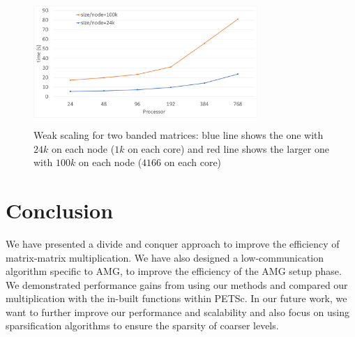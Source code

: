\begin{figure}[tbh]
 \centering
 \includegraphics[width=8.5cm,height=4.8cm]{./figures/weak1.pdf}
 \caption{Weak scaling for two banded matrices: blue line shows the one with $24k$ on each node ($1k$ on each core) and red line shows the larger one with $100k$ on each node ($4166$ on each core)}
 \label{fig:weak1}
\end{figure}

\section{Conclusion}
\label{sec:conc}

We have presented a divide and conquer approach to improve the efficiency of matrix-matrix multiplication. We have also designed a low-communication algorithm specific to AMG, to improve the efficiency of the AMG setup phase. We demonstrated performance gains from using our methods and compared our multiplication with the in-built functions within PETSc. In our future work, we want to further improve our performance and scalability and also focus on using sparsification algorithms to ensure the sparsity of coarser levels. 

